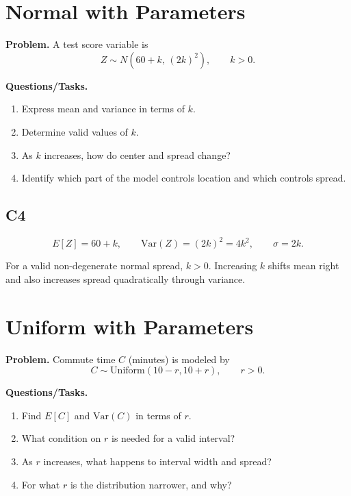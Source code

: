 \section{Normal with Parameters}

\textbf{Problem.}
A test score variable is
\[
Z\sim N(60+k,\,(2k)^2),\qquad k>0.
\]

\textbf{Questions/Tasks.}
\begin{enumerate}[label=\textbf{\alph*)}]
  \item Express mean and variance in terms of \(k\).
  \item Determine valid values of \(k\).
  \item As \(k\) increases, how do center and spread change?
  \item Identify which part of the model controls location and which controls spread.
\end{enumerate}

\subsection*{C4}
\[
E[Z]=60+k,
\qquad
\mathrm{Var}(Z)=(2k)^2=4k^2,
\qquad
\sigma=2k.
\]
\begin{center}
\end{center}
For a valid non-degenerate normal spread, \(k>0\). Increasing \(k\) shifts mean right and also increases spread quadratically through variance.

\section{Uniform with Parameters}

\textbf{Problem.}
Commute time \(C\) (minutes) is modeled by
\[
C\sim \text{Uniform}(10-r,10+r),\qquad r>0.
\]

\textbf{Questions/Tasks.}
\begin{enumerate}[label=\textbf{\alph*)}]
  \item Find \(E[C]\) and \(\mathrm{Var}(C)\) in terms of \(r\).
  \item What condition on \(r\) is needed for a valid interval?
  \item As \(r\) increases, what happens to interval width and spread?
  \item For what \(r\) is the distribution narrower, and why?
\end{enumerate}


